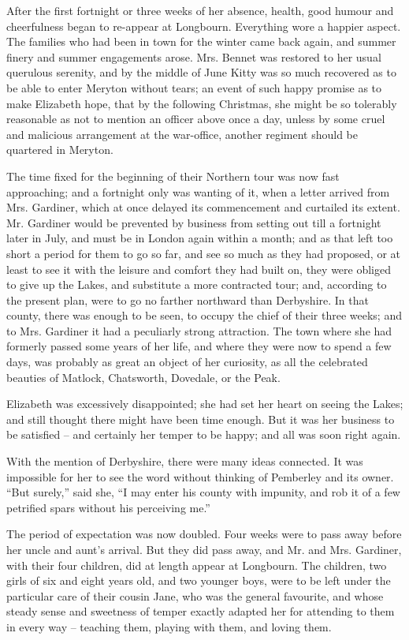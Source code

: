 After the first fortnight or three weeks of her absence,
health, good humour and cheerfulness began to re-appear
at Longbourn. Everything wore a happier aspect. The
families who had been in town for the winter came back
again, and summer finery and summer engagements arose.
Mrs. Bennet was restored to her usual querulous serenity,
and by the middle of June Kitty was so much recovered
as to be able to enter Meryton without tears; an event
of such happy promise as to make Elizabeth hope, that
by the following Christmas, she might be so tolerably
reasonable as not to mention an officer above once a day,
unless by some cruel and malicious arrangement at the
war-office, another regiment should be quartered in
Meryton.

The time fixed for the beginning of their Northern tour
was now fast approaching; and a fortnight only was
wanting of it, when a letter arrived from Mrs. Gardiner,
which at once delayed its commencement and curtailed
its extent. Mr. Gardiner would be prevented by business
from setting out till a fortnight later in July, and must
be in London again within a month; and as that left
too short a period for them to go so far, and see so much
as they had proposed, or at least to see it with the leisure
and comfort they had built on, they were obliged to give
up the Lakes, and substitute a more contracted tour; and,
according to the present plan, were to go no farther
northward than Derbyshire. In that county, there was
enough to be seen, to occupy the chief of their three weeks;
and to Mrs. Gardiner it had a peculiarly strong attraction.
The town where she had formerly passed some years of
her life, and where they were now to spend a few days,
was probably as great an object of her curiosity, as all
the celebrated beauties of Matlock, Chatsworth, Dovedale,
or the Peak.

Elizabeth was excessively disappointed; she had set
her heart on seeing the Lakes; and still thought there
might have been time enough. But it was her business
to be satisfied -- and certainly her temper to be happy;
and all was soon right again.

With the mention of Derbyshire, there were many ideas
connected. It was impossible for her to see the word
without thinking of Pemberley and its owner. “But
surely,” said she, “I may enter his county with impunity,
and rob it of a few petrified spars without his perceiving
me.”

The period of expectation was now doubled. Four
weeks were to pass away before her uncle and aunt’s
arrival. But they did pass away, and Mr. and Mrs.
Gardiner, with their four children, did at length appear
at Longbourn. The children, two girls of six and eight
years old, and two younger boys, were to be left under
the particular care of their cousin Jane, who was the
general favourite, and whose steady sense and sweetness
of temper exactly adapted her for attending to them in
every way -- teaching them, playing with them, and loving
them.

